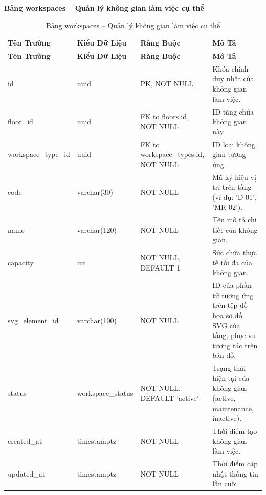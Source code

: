 \textbf{Bảng workspaces -- Quản lý không gian làm việc cụ thể}
\label{table:workspaces}
\begin{longtable}{|p{3cm}|p{2.5cm}|p{3.5cm}|p{5cm}|}
\caption{Bảng workspaces -- Quản lý không gian làm việc cụ thể} \\
\hline
\textbf{Tên Trường} & \textbf{Kiểu Dữ Liệu} & \textbf{Ràng Buộc} & \textbf{Mô Tả} \\
\hline
\endfirsthead
\hline
\textbf{Tên Trường} & \textbf{Kiểu Dữ Liệu} & \textbf{Ràng Buộc} & \textbf{Mô Tả} \\
\hline
\endhead
id & uuid & PK, NOT NULL & Khóa chính duy nhất của không gian làm việc. \\
\hline
floor\_id & uuid & FK to floors.id, NOT NULL & ID tầng chứa không gian này. \\
\hline
workspace\_type\_id & uuid & FK to workspace\_\allowbreak types.id, NOT NULL & ID loại không gian tương ứng. \\
\hline
code & varchar(30) & NOT NULL & Mã ký hiệu vị trí trên tầng (ví dụ: 'D-01', 'MR-02'). \\
\hline
name & varchar(120) & NOT NULL & Tên mô tả chi tiết của không gian. \\
\hline
capacity & int & NOT NULL, DEFAULT 1 & Sức chứa thực tế tối đa của không gian. \\
\hline
svg\_element\_id & varchar(100) & NOT NULL & ID của phần tử tương ứng trên tệp đồ họa sơ đồ SVG của tầng, phục vụ tương tác trên bản đồ. \\
\hline
status & workspace\_status & NOT NULL, DEFAULT 'active' & Trạng thái hiện tại của không gian (active, maintenance, inactive). \\
\hline
created\_at & timestamptz & NOT NULL & Thời điểm tạo không gian làm việc. \\
\hline
updated\_at & timestamptz & NOT NULL & Thời điểm cập nhật thông tin lần cuối. \\
\hline
\end{longtable}

